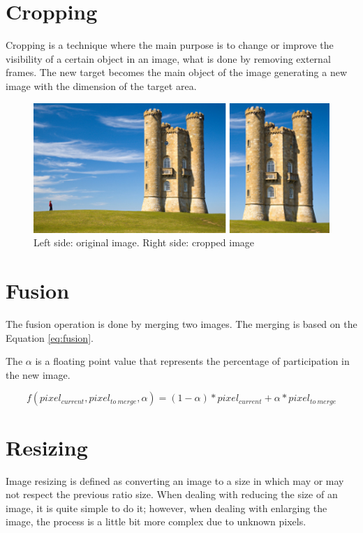 \documentclass{article}
\begin{document}
\section{Cropping}

	Cropping is a technique where the main purpose is to change or improve the visibility of a certain object in an image, 
	what is done by removing external frames. 
	The new target becomes the main object of the image generating a new image with the dimension of the target area.  

	\begin{figure}[H]
	\centering
	\includegraphics[scale=2]{images/crop}
	\caption{Left side: original image. Right side: cropped image}
	\label{fig:cropping}
	\end{figure}


\section{Fusion}

	The fusion operation is done by merging two images. The merging is based on the Equation \ref{eq:fusion}. 
	
	The $\alpha$ is a floating point value that represents the percentage of participation in the new image. 

	\begin{equation}
		f(pixel_{current},pixel_{to\ merge},\alpha)=(1-\alpha)*pixel_{current}+\alpha*pixel_{to\ merge}
		\label{eq:fusion}
	\end{equation}

\section{Resizing}

	Image resizing is defined as converting an image to a size in which may or may not respect the previous ratio size.
	When dealing with reducing the size of an image, it is quite simple to do it; however, when dealing with enlarging 
	the image, the process is a little bit more complex due to unknown pixels.
\end{document}
